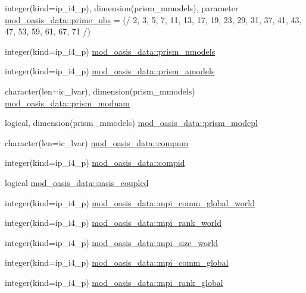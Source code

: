 \begin{DoxyCompactItemize}
\item 
integer(kind=ip\+\_\+i4\+\_\+p), dimension(prism\+\_\+mmodels), parameter \hyperlink{namespacemod__oasis__data_a56cd74c9147ef028573f2d5eb5e06fdc}{mod\+\_\+oasis\+\_\+data\+::prime\+\_\+nbs} = (/ 2, 3, 5, 7, 11, 13, 17, 19, 23, 29, 31, 37, 41, 43, 47, 53, 59, 61, 67, 71 /)
\item 
integer(kind=ip\+\_\+i4\+\_\+p) \hyperlink{namespacemod__oasis__data_a5915b02f461626d5a6cffbf037daa75e}{mod\+\_\+oasis\+\_\+data\+::prism\+\_\+nmodels}
\item 
integer(kind=ip\+\_\+i4\+\_\+p) \hyperlink{namespacemod__oasis__data_ac73f95bc17215d09b67c6c4d3adc07b7}{mod\+\_\+oasis\+\_\+data\+::prism\+\_\+amodels}
\item 
character(len=ic\+\_\+lvar), dimension(prism\+\_\+mmodels) \hyperlink{namespacemod__oasis__data_abd4b98e9f321bc073d5a8e0292ba7131}{mod\+\_\+oasis\+\_\+data\+::prism\+\_\+modnam}
\item 
logical, dimension(prism\+\_\+mmodels) \hyperlink{namespacemod__oasis__data_ad5282716e60cbe5e8c1ced7758fc9ae1}{mod\+\_\+oasis\+\_\+data\+::prism\+\_\+modcpl}
\item 
character(len=ic\+\_\+lvar) \hyperlink{namespacemod__oasis__data_a8379835615758ccf7a4287dde5785681}{mod\+\_\+oasis\+\_\+data\+::compnm}
\item 
integer(kind=ip\+\_\+i4\+\_\+p) \hyperlink{namespacemod__oasis__data_ab53c9f7676f84fdf1050cea5efcd3e7f}{mod\+\_\+oasis\+\_\+data\+::compid}
\item 
logical \hyperlink{namespacemod__oasis__data_a5056590b195dc981725173c79e52de3b}{mod\+\_\+oasis\+\_\+data\+::oasis\+\_\+coupled}
\item 
integer(kind=ip\+\_\+i4\+\_\+p) \hyperlink{namespacemod__oasis__data_ade1a6490bdec114ed8e10eb47b2bdfe9}{mod\+\_\+oasis\+\_\+data\+::mpi\+\_\+comm\+\_\+global\+\_\+world}
\item 
integer(kind=ip\+\_\+i4\+\_\+p) \hyperlink{namespacemod__oasis__data_abcd9856ba23114a6dc7b823958aa43cb}{mod\+\_\+oasis\+\_\+data\+::mpi\+\_\+rank\+\_\+world}
\item 
integer(kind=ip\+\_\+i4\+\_\+p) \hyperlink{namespacemod__oasis__data_acec56337253693d37772a3a0054826e2}{mod\+\_\+oasis\+\_\+data\+::mpi\+\_\+size\+\_\+world}
\item 
integer(kind=ip\+\_\+i4\+\_\+p) \hyperlink{namespacemod__oasis__data_a4bbff51054fd1746849de9defb3d5252}{mod\+\_\+oasis\+\_\+data\+::mpi\+\_\+comm\+\_\+global}
\item 
integer(kind=ip\+\_\+i4\+\_\+p) \hyperlink{namespacemod__oasis__data_af9bb2a4f321e7d7750e90c01022828fe}{mod\+\_\+oasis\+\_\+data\+::mpi\+\_\+rank\+\_\+global}

\end{DoxyCompactItemize}
